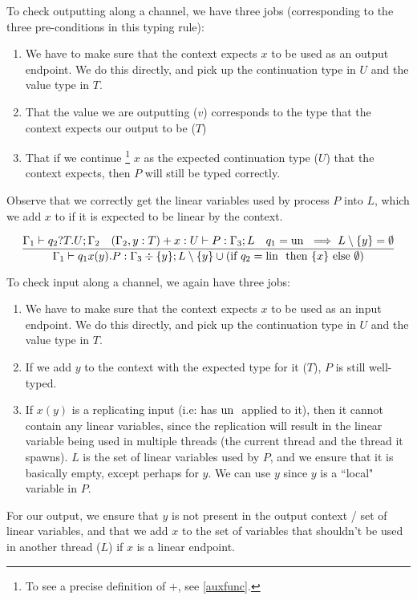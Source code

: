 To check outputting along a channel, we have three jobs (corresponding to the three pre-conditions in this typing rule):
\begin{enumerate}
    \item We have to make sure that the context expects $x$ to be used as an output endpoint. We do this directly, and pick up the continuation type in $U$ and the value type in $T$.
    \item That the value we are outputting ($v$) corresponds to the type that the context expects our output to be ($T$)
    \item That if we continue \footnote{To see a precise definition of $+$, see \ref{auxfunc}.} $x$ as the expected continuation type ($U$) that the context expects, then $P$ will still be typed correctly.
\end{enumerate}

Observe that we correctly get the linear variables used by process $P$ into $L$, which we add $x$ to if it is expected to be linear by the context.

$$
\frac{\Gamma_1 \vdash q_2?T.U ; \Gamma_2 \quad (\Gamma_2, y : T) + x : U \vdash P : \Gamma_3 ; L \quad q_1 = \text{un } \implies L \setminus \{y\} = \emptyset}{\Gamma_1 \vdash q_1 x(y) . P : \Gamma_3 \div \{y\} ; L \setminus \{y\} \cup  (\text{if } q_2 = \text{lin } \text{ then } \{x\} \text{ else } \emptyset)}
$$

To check input along a channel, we again have three jobs:
\begin{enumerate}
    \item We have to make sure that the context expects $x$ to be used as an input endpoint. We do this directly, and pick up the continuation type in $U$ and the value type in $T$.
    \item If we add $y$ to the context with the expected type for it ($T$), $P$ is still well-typed. 
    \item If $x(y)$ is a replicating input (i.e: has $\text{un }$ applied to it), then it cannot contain any linear variables, since the replication will result in the linear variable being used in multiple threads (the current thread and the thread it spawns). $L$ is the set of linear variables used by $P$, and we ensure that it is basically empty, except perhaps for $y$. We can use $y$ since $y$ is a ``local" variable in $P$.
\end{enumerate}

For our output, we ensure that $y$ is not present in the output context / set of linear variables, and that we add $x$ to the set of variables that shouldn't be used in another thread ($L$) if $x$ is a linear endpoint.

